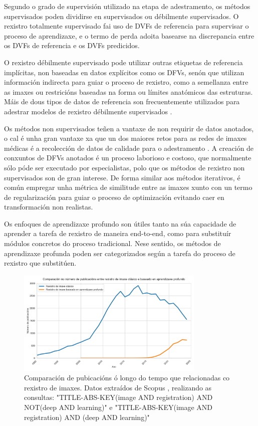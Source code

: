Segundo o grado de supervisión utilizado na etapa de adestramento, os métodos supervisados poden dividirse en supervisados ou débilmente supervisados.
O rexistro totalmente supervisado fai uso de DVFs de referencia para supervisar o proceso de aprendizaxe, e o termo de perda adoita basearse na discrepancia entre os DVFs de referencia e os DVFs predicidos.

O rexistro débilmente supervisado pode utilizar outras etiquetas de referencia implícitas, non baseadas en datos explícitos como os DFVs, senón que utilizan información indirecta para guiar o proceso de rexistro, como a semellanza entre as imaxes ou restricións baseadas na forma ou límites anatómicos das estruturas.
Máis de dous tipos de datos de referencia son frecuentemente utilizados para adestrar modelos de rexistro débilmente supervisados \cite{bharati2022deeplearningmedicalimage}.

Os métodos non supervisados teñen a vantaxe de non requirir de datos anotados, o cal é unha gran vantaxe xa que un dos maiores retos para as redes de imaxes médicas é a recolección de datos de calidade para o adestramento \cite{medicalimageanalysis}.
A creación de conxuntos de DFVs anotados é un proceso laborioso e costoso, que normalmente sólo póde ser executado por especialistas, polo que os métodos de rexistro non supervisados son de gran interese.
De forma similar aos métodos iterativos, é común empregar unha métrica de similitude entre as imaxes xunto con un termo de regularización para guiar o proceso de optimización evitando caer en transformación non realistas.

Os enfoques de aprendizaxe profundo son útiles tanto na súa capacidade de aprender a tarefa de rexistro de maneira end-to-end, como para substituír módulos concretos do proceso tradicional.
Nese sentido, os métodos de aprendizaxe profunda poden ser categorizados según a tarefa do proceso de rexistro que substitúen.

\begin{figure}[tbp]
\centering
\includegraphics[width=0.8\textwidth]{imaxes/methods_comp.png}
\caption{Comparación de pubicacións ó longo do tempo que relacionadas co rexistro de imaxes. Datos extraídos de Scopus \cite{scopus}, realizando as consultas: "TITLE-ABS-KEY(image AND registration) AND NOT(deep AND learning)" e "TITLE-ABS-KEY(image AND registration) AND (deep AND learning)"}
\label{fig:method_comp}
\end{figure}

